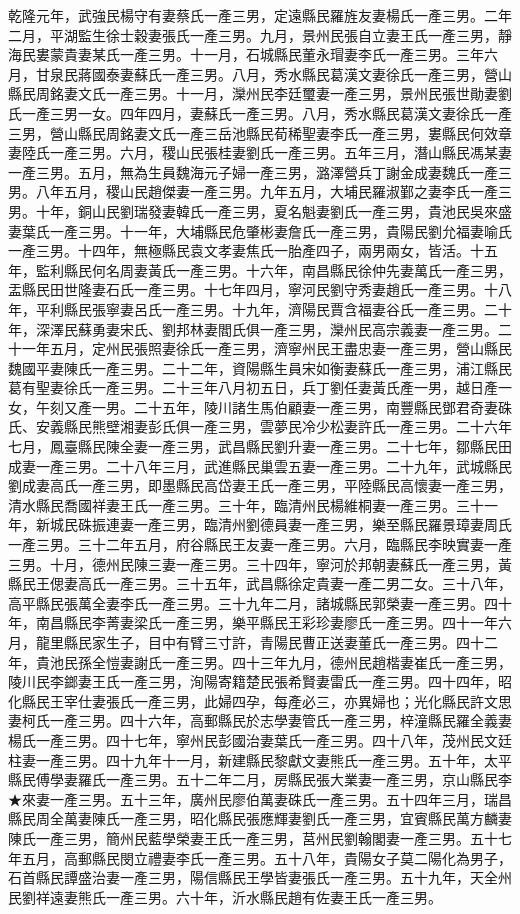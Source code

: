 \begin{pinyinscope}
乾隆元年，武強民楊守有妻蔡氏一產三男，定遠縣民羅旌友妻楊氏一產三男。二年二月，平湖監生徐士穀妻張氏一產三男。九月，景州民張自立妻王氏一產三男，靜海民婁蒙貴妻某氏一產三男。十一月，石城縣民董永瑁妻李氏一產三男。三年六月，甘泉民蔣國泰妻蘇氏一產三男。八月，秀水縣民葛漢文妻徐氏一產三男，營山縣民周銘妻文氏一產三男。十一月，灤州民李廷璽妻一產三男，景州民張世勛妻劉氏一產三男一女。四年四月，妻蘇氏一產三男。八月，秀水縣民葛漢文妻徐氏一產三男，營山縣民周銘妻文氏一產三岳池縣民荀稀聖妻李氏一產三男，婁縣民何效章妻陸氏一產三男。六月，稷山民張桂妻劉氏一產三男。五年三月，潛山縣民馮某妻一產三男。五月，無為生員魏海元子婦一產三男，潞澤營兵丁謝金成妻魏氏一產三男。八年五月，稷山民趙傑妻一產三男。九年五月，大埔民羅淑鄞之妻李氏一產三男。十年，銅山民劉瑞發妻韓氏一產三男，夏名魁妻劉氏一產三男，貴池民吳來盛妻葉氏一產三男。十一年，大埔縣民危肇彬妻詹氏一產三男，貴陽民劉允福妻喻氏一產三男。十四年，無極縣民袁文孝妻焦氏一胎產四子，兩男兩女，皆活。十五年，監利縣民何名周妻黃氏一產三男。十六年，南昌縣民徐仲先妻萬氏一產三男，盂縣民田世隆妻石氏一產三男。十七年四月，寧河民劉守秀妻趙氏一產三男。十八年，平利縣民張寧妻呂氏一產三男。十九年，濟陽民賈含福妻谷氏一產三男。二十年，深澤民蘇勇妻宋氏、劉邦林妻閻氏俱一產三男，灤州民高宗義妻一產三男。二十一年五月，定州民張照妻徐氏一產三男，濟寧州民王盡忠妻一產三男，營山縣民魏國平妻陳氏一產三男。二十二年，資陽縣生員宋如衡妻蘇氏一產三男，浦江縣民葛有聖妻徐氏一產三男。二十三年八月初五日，兵丁劉任妻黃氏產一男，越日產一女，午刻又產一男。二十五年，陵川諸生馬伯顧妻一產三男，南豐縣民鄧君奇妻硃氏、安義縣民熊壁湘妻彭氏俱一產三男，雲夢民冷少松妻許氏一產三男。二十六年七月，鳳臺縣民陳全妻一產三男，武昌縣民劉升妻一產三男。二十七年，鄒縣民田成妻一產三男。二十八年三月，武進縣民巢雲五妻一產三男。二十九年，武城縣民劉成妻高氏一產三男，即墨縣民高岱妻王氏一產三男，平陸縣民高懷妻一產三男，清水縣民喬國祥妻王氏一產三男。三十年，臨清州民楊維桐妻一產三男。三十一年，新城民硃振連妻一產三男，臨清州劉德員妻一產三男，樂至縣民羅景璋妻周氏一產三男。三十二年五月，府谷縣民王友妻一產三男。六月，臨縣民李映實妻一產三男。十月，德州民陳三妻一產三男。三十四年，寧河於邦朝妻蘇氏一產三男，黃縣民王偲妻高氏一產三男。三十五年，武昌縣徐定貴妻一產二男二女。三十八年，高平縣民張萬全妻李氏一產三男。三十九年二月，諸城縣民郭榮妻一產三男。四十年，南昌縣民李菁妻梁氏一產三男，樂平縣民王彩珍妻廖氏一產三男。四十一年六月，龍里縣民家生子，目中有臂三寸許，青陽民曹正送妻董氏一產三男。四十二年，貴池民孫全愷妻謝氏一產三男。四十三年九月，德州民趙楷妻崔氏一產三男，陵川民李鎯妻王氏一產三男，洵陽寄籍楚民張希賢妻雷氏一產三男。四十四年，昭化縣民王宰仕妻張氏一產三男，此婦四孕，每產必三，亦異婦也；光化縣民許文思妻柯氏一產三男。四十六年，高郵縣民於志學妻管氏一產三男，梓潼縣民羅全義妻楊氏一產三男。四十七年，寧州民彭國治妻葉氏一產三男。四十八年，茂州民文廷柱妻一產三男。四十九年十一月，新建縣民黎獻文妻熊氏一產三男。五十年，太平縣民傅學妻羅氏一產三男。五十二年二月，房縣民張大業妻一產三男，京山縣民李★來妻一產三男。五十三年，廣州民廖伯萬妻硃氏一產三男。五十四年三月，瑞昌縣民周全萬妻陳氏一產三男，昭化縣民張應輝妻劉氏一產三男，宜賓縣民萬方麟妻陳氏一產三男，簡州民藍學榮妻王氏一產三男，莒州民劉翰閣妻一產三男。五十七年五月，高郵縣民閔立禮妻李氏一產三男。五十八年，貴陽女子莫二陽化為男子，石首縣民譚盛治妻一產三男，陽信縣民王學皆妻張氏一產三男。五十九年，天全州民劉祥遠妻熊氏一產三男。六十年，沂水縣民趙有佐妻王氏一產三男。


\end{pinyinscope}
